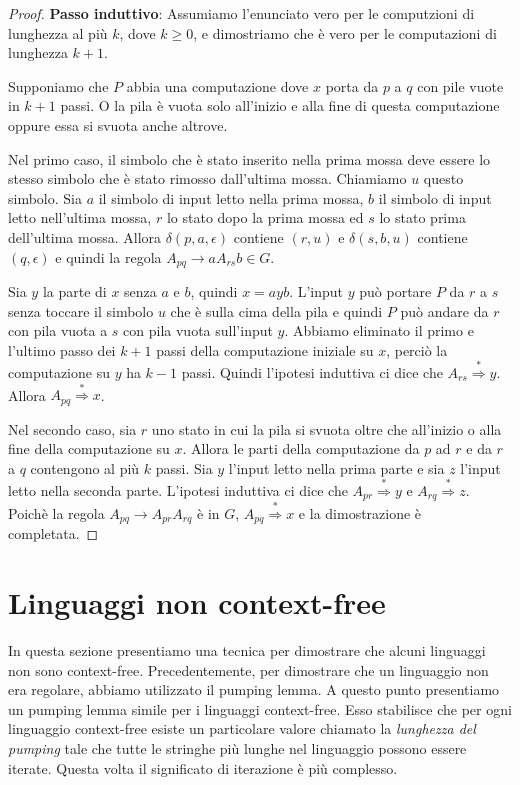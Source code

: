 \documentclass[12pt]{report}
\newcounter{lemma}
\begin{document}
\begin{proof}
	\textbf{Passo induttivo}: Assumiamo l'enunciato vero per le computzioni di lunghezza al più $k$, dove $k \geq 0$, e dimostriamo che è vero per le computazioni di lunghezza $k + 1$.

	Supponiamo che $P$ abbia una computazione dove $x$ porta da $p$ a $q$ con pile vuote in $k + 1$ passi. O la pila è vuota solo all'inizio e alla fine di questa computazione oppure essa si svuota anche altrove.

	Nel primo caso, il simbolo che è stato inserito nella prima mossa deve essere lo stesso simbolo che è stato rimosso dall'ultima mossa. Chiamiamo $u$ questo simbolo. Sia $a$ il simbolo di input letto nella prima mossa, $b$ il simbolo di input letto nell'ultima mossa, $r$ lo stato dopo la prima mossa ed $s$ lo stato prima dell'ultima mossa. Allora $\delta(p, a, \epsilon)$ contiene $(r, u)$ e $\delta(s, b, u)$ contiene $(q, \epsilon)$ e quindi la regola $A_{pq} \to aA_{rs}b \in G$.

	Sia $y$ la parte di $x$ senza $a$ e $b$, quindi $x = ayb$. L'input $y$ può portare $P$ da $r$ a $s$ senza toccare il simbolo $u$ che è sulla cima della pila e quindi $P$ può andare da $r$ con pila vuota a $s$ con pila vuota sull'input $y$. Abbiamo eliminato il primo e l'ultimo passo dei $k + 1$ passi della computazione iniziale su $x$, perciò la computazione su $y$ ha $k - 1$ passi. Quindi l'ipotesi induttiva ci dice che $A_{rs} \overset{*}{\Rightarrow} y$. Allora $A_{pq} \overset{*}{\Rightarrow} x$.

	Nel secondo caso, sia $r$ uno stato in cui la pila si svuota oltre che all'inizio o alla fine della computazione su $x$. Allora le parti della computazione da $p$ ad $r$ e da $r$ a $q$ contengono al più $k$ passi. Sia $y$ l'input letto nella prima parte e sia $z$ l'input letto nella seconda parte. L'ipotesi induttiva ci dice che $A_{pr} \overset{*}{\Rightarrow} y$ e $A_{rq} \overset{*}{\Rightarrow} z$. Poichè la regola $A_{pq} \to A_{pr}A_{rq}$ è in $G$, $A_{pq} \overset{*}{\Rightarrow} x$ e la dimostrazione è completata.
\end{proof}
\section{Linguaggi non context-free}
In questa sezione presentiamo una tecnica per dimostrare che alcuni linguaggi non sono context-free. Precedentemente, per dimostrare che un linguaggio non era regolare, abbiamo utilizzato il pumping lemma. A questo punto presentiamo un pumping lemma simile per i linguaggi context-free. Esso stabilisce che per ogni linguaggio context-free esiste un particolare valore chiamato la \textit{lunghezza del pumping} tale che tutte le stringhe più lunghe nel linguaggio possono essere iterate. Questa volta il significato di iterazione è più complesso.
\end{document}
